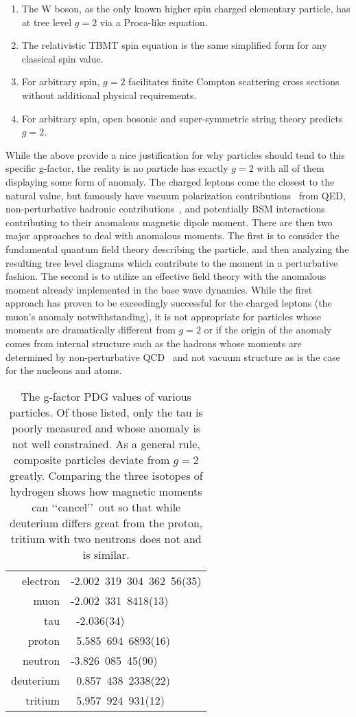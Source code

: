 \begin{enumerate}[nosep]
	\item The W boson, as the only known higher spin charged elementary particle, has at tree level $g=2$ via a Proca-like equation.
	\item The relativistic TBMT spin equation is the same simplified form for any classical spin value.
	\item For arbitrary spin, $g=2$ facilitates finite Compton scattering cross sections without additional physical requirements.
	\item For arbitrary spin, open bosonic and super-symmetric string theory predicts $g=2$.
\end{enumerate}
While the above provide a nice justification for why particles should tend to this specific g-factor, the reality is no particle has exactly $g=2$ with all of them displaying some form of anomaly. The charged leptons come the closest to the natural value, but famously have vacuum polarization contributions~\citep{Schwinger:1951nm} from QED, non-perturbative hadronic contributions~\citep{Jegerlehner:2017gek}, and potentially BSM interactions~\citep{Knecht:2003kc} contributing to their anomalous magnetic dipole moment. There are then two major approaches to deal with anomalous moments. The first is to consider the fundamental quantum field theory describing the particle, and then analyzing the resulting tree level diagrams which contribute to the moment in a perturbative fashion. The second is to utilize an effective field theory with the anomalous moment already implemented in the base wave dynamics. While the first approach has proven to be exceedingly successful for the charged leptons (the muon's anomaly notwithstanding), it is not appropriate for particles whose moments are dramatically different from $g=2$ or if the origin of the anomaly comes from internal structure such as the hadrons whose moments are determined by non-perturbative QCD~\cite{Eichmann:2016yit,Pacetti:2014jai} and not vacuum structure as is the case for the nucleons and atoms.

\begin{table}
	\centering
\begin{tabular}{|r|l|}
	electron & -2.002\ 319\ 304\ 362\ 56(35)\\
	muon & -2.002\ 331\ 8418(13)\\
	tau & \ -2.036(34)\\
	proton & \ 5.585\ 694\ 6893(16)\\
	neutron & -3.826\ 085\ 45(90)\\
	deuterium & \ 0.857\ 438\ 2338(22)\\
	tritium & \ 5.957\ 924\ 931(12)
\end{tabular}
	\caption{The g-factor PDG values of various particles. Of those listed, only the tau is poorly measured and whose anomaly is not well constrained. As a general rule, composite particles deviate from $g=2$ greatly. Comparing the three isotopes of hydrogen shows how magnetic moments can \lq\lq cancel\rq\rq\ out so that while deuterium differs great from the proton, tritium with two neutrons does not and is similar.}
	\label{ajs:table:01}
\end{table}

